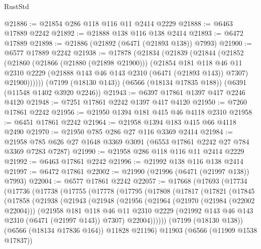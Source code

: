 \begin{lexlean}{RustStd}
\begin{coremodule}
{\begin{coremodule}
{{{{{{{{{{{{{{{{{{{{{{{{{{@21886 := @21854 @286 @118 @116 @11 @2414 @2229
@21888 := @6463 @17889 @2242
@21892 := @21888 @138 @116 @138 @2414
@21893 := @6472 @17889
@21898 := @21886 (@21892 (@6471 (@21893 @138)) @7993)
@21900 := @6577 @17889 @2242
@21938 := @17878
    (@21834
      (@21839
        (@21844
          (@21852
            (@21860
              (@21866 (@21880 (@21898 @21900)))
              (@21854
                @181
                @118
                @46
                @11
                @2310
                @2229
                (@21888 @143 @46 @143 @2310 (@6471 (@21893 @143)) @7307)
                @21900))))))
    (@7199 (@18130 @143))
    (@6566 (@18134 @17835 @188))
    (@6391 (@11548 @1402 @3920 @2246))
@21943 := @6397 @17861 @1397 @417 @2246 @4120
@21948 := @7251 @17861 @2242 @1397 @417 @4120
@21950 := @7260 @17861 @2242
@21956 := @21950 @1394 @181 @415 @46 @4118 @2310
@21958 := @6451 @17861 @2242
@21964 := @21958 @1394 @183 @415 @66 @4118 @2490
@21970 := @21950 @785 @286 @27 @116 @3369 @2414
@21984 := @21958 @785 @626 @27 @1648 @3369 @3091 (@6553 @17861 @2242 @27 @784 @3369 @7283 @7287)
@21990 := @21958 @286 @118 @116 @11 @2414 @2229
@21992 := @6463 @17861 @2242
@21996 := @21992 @138 @116 @138 @2414
@21997 := @6472 @17861
@22002 := @21990 (@21996 (@6471 (@21997 @138)) @7993)
@22004 := @6577 @17861 @2242
@22057 := @17668
    (@17693
      (@17734
        (@17736
          (@17738
            (@17755
              (@17778
                (@17795
                  (@17808
                    (@17817
                      (@17821
                        (@17845
                          (@17858
                            (@21938
                              (@21943
                                (@21948
                                  (@21956
                                    (@21964
                                      (@21970 (@21984 (@22002 @22004)))
                                      (@21958
                                        @181
                                        @118
                                        @46
                                        @11
                                        @2310
                                        @2229
                                        (@21992 @143 @46 @143 @2310 (@6471 (@21997 @143)) @7307)
                                        @22004))))))
                            (@7199 (@18130 @138))
                            (@6566 (@18134 @17836 @164))
                            @11828
                            @21196)
                          @11903
                          (@6566 (@11909 @1538 @17837))
}}}}}}}}}}}}}}}}}}}}}}}}}}
\end{coremodule}}
\end{coremodule}
\end{lexlean}
